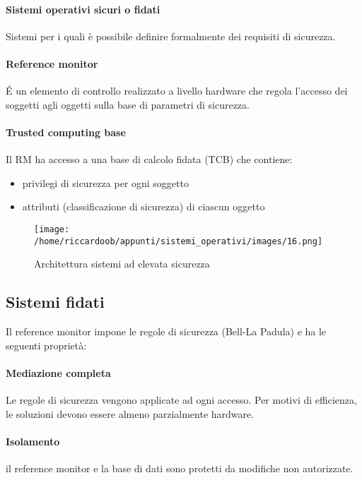 \paragraph{Sistemi operativi sicuri o fidati} Sistemi per i quali è possibile definire formalmente dei requisiti di sicurezza.

\paragraph{Reference monitor} É un elemento di controllo realizzato a livello hardware che regola l'accesso dei soggetti agli oggetti sulla base di parametri di sicurezza.

\paragraph{Trusted computing base} Il RM ha accesso a una base di calcolo fidata (TCB) che contiene:
\begin{itemize}
    \item privilegi di sicurezza per ogni soggetto
    \item attributi (classificazione di sicurezza) di ciascun oggetto
\end{itemize}

\begin{figure}[H]
    \caption{Architettura sistemi ad elevata sicurezza}
    \centering
    \texttt{[image: /home/riccardoob/appunti/sistemi\_operativi/images/16.png]}
\end{figure}

\subsection{Sistemi fidati}

Il reference monitor impone le regole di sicurezza (Bell-La Padula) e ha le seguenti proprietà:

\paragraph{Mediazione completa} Le regole di sicurezza vengono applicate ad ogni accesso. Per motivi di efficienza, le soluzioni devono essere almeno parzialmente hardware.

\paragraph{Isolamento} il reference monitor e la base di dati sono protetti da modifiche non autorizzate.

